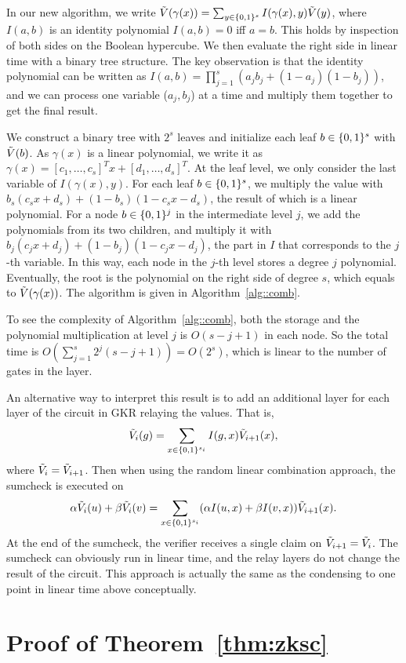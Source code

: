 In our new algorithm, we write $\tilde{V}(\gamma(x)) = \sum_{y\in\{0,1\}^s}I(\gamma(x), y)\tilde{V}(y)$, where $I(a,b)$ is an identity polynomial $I(a,b)=0$ iff $a=b$. This holds by inspection of both sides on the Boolean hypercube. We then evaluate the right side in linear time with a binary tree structure. The key observation is that the identity polynomial can be written as $I(a,b) = \prod_{j=1}^s (a_jb_j+(1-a_j)(1-b_j))$, and we can process one variable ($a_j,b_j$) at a time and multiply them together to get the final result. 

We construct a binary tree with $2^s$ leaves and initialize each leaf $b\in\{0,1\}^s$ with $\tilde{V}(b)$. As $\gamma(x)$ is a linear polynomial, we write it as $\gamma(x) = [c_1, \ldots, c_s]^T x+ [d_1, \ldots, d_s]^T$. At the leaf level, we only consider the last variable of $I(\gamma(x), y)$. For each leaf $b\in\{0,1\}^s$, we multiply the value with $b_s(c_s x+ d_s)+(1-b_s)(1-c_s x- d_s)$, the result of which is a linear polynomial. For a node $b\in\{0,1\}^j$ in the intermediate level $j$, we add the polynomials from its two children, and multiply it with $b_j(c_j x+ d_j)+(1-b_j)(1-c_j x- d_j)$, the part in $I$ that corresponds to the $j$-th variable. In this way, each node in the $j$-th level stores a degree $j$ polynomial. Eventually, the root is the polynomial on the right side of degree $s$, which equals to $\tilde{V}(\gamma(x))$. The algorithm is given in Algorithm~\ref{alg::comb}. 

To see the complexity of Algorithm~\ref{alg::comb}, both the storage and the polynomial multiplication at level $j$ is $O(s-j+1)$ in each node. So the total time is $O(\sum_{j=1}^s 2^j (s-j+1)) = O(2^s)$, which is linear to the number of gates in the layer.

An alternative way to interpret this result is to add an additional layer for each layer of the circuit in GKR relaying the values. That is, $$\tilde{V}_{i}(g) = \sum_{x\in\{0,1\}^{s_i}}I(g,x)\tilde{V}_{i+1}(x),$$ where $\tilde{V}_i = \tilde{V}_{i+1}$. Then when using the random linear combination approach, the sumcheck is executed on $$\alpha\tilde{V}_{i}(u)+\beta\tilde{V}_i(v) = \sum_{x\in\{0,1\}^{s_i}}(\alpha I(u,x)+\beta I(v,x))\tilde{V}_{i+1}(x).$$
At the end of the sumcheck, the verifier receives a single claim on $\tilde{V}_{i+1} = \tilde{V}_{i}$. The sumcheck can obviously run in linear time, and the relay layers do not change the result of the circuit. This approach is actually the same as the condensing to one point in linear time above conceptually. 



\section{Proof of Theorem~\ref{thm:zksc}}\label{app:proofsc}

